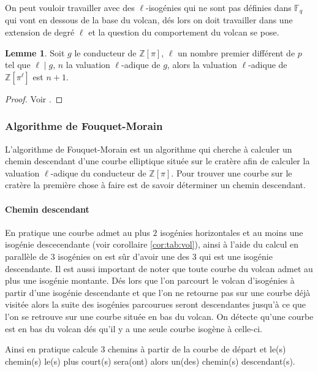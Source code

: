 \documentclass[10pt,a4paper]{book}
\theoremstyle{plain}
\theoremstyle{definition}
\newtheorem{lem}[thm]{Lemme}
\theoremstyle{definition}
\theoremstyle{definition}
\theoremstyle{definition}
\theoremstyle{remark}
\theoremstyle{remark}
\theoremstyle{definition}
\begin{document}
On peut vouloir travailler avec des $\ell$-isogénies qui ne sont pas définies dans $\mathbb{F}_q$ qui vont en dessous de la base du volcan, dés lors on doit travailler dans une extension de degré $\ell$ et la question du comportement du volcan se pose.

\begin{lem}
\label{lem:val:ext}
Soit $g$ le conducteur de $\mathbb{Z}[\pi]$, $\ell$ un nombre premier différent de $p$ tel que $\ell \mid g$, $n$ la valuation $\ell$-adique de $g$, alors la valuation $\ell$-adique de $\mathbb{Z}[\pi^{\ell}]$ est $n+1$. 
\end{lem}

\begin{proof}
Voir \cite[Proposition 6]{MiretMSTV08}.
\end{proof}

\subsubsection{Algorithme de Fouquet-Morain}
\label{sub:alg:FM}
L'algorithme de Fouquet-Morain \cite{FouquetMorain02} est un algorithme qui cherche à calculer un chemin descendant d'une courbe elliptique située sur le cratère afin de calculer la valuation $\ell$-adique du conducteur de $\mathbb{Z}[\pi]$. Pour trouver une courbe sur le cratère la première chose à faire est de savoir déterminer un chemin descendant. 

\paragraph{Chemin descendant}
En pratique une courbe admet au plus $2$ isogénies horizontales et au moins une isogénie descecendante (voir corollaire \ref{cor:tab:vol}), ainsi à l'aide du calcul en parallèle de 3 isogénies on est sûr d'avoir une des 3 qui est une isogénie descendante. Il est aussi important de noter que toute courbe du volcan admet au plus une isogénie montante. Dés lors que l'on parcourt le volcan d'isogénies à partir d'une isogénie descendante et que l'on ne retourne pas sur une courbe déjà visitée alors la suite des isogénies parcourues seront descendantes jusqu'à ce que l'on se retrouve sur une courbe située en bas du volcan. On détecte qu'une courbe est en bas du volcan dés qu'il y a une seule courbe isogène à celle-ci.

Ainsi en pratique \cite{FouquetMorain02} calcule 3 chemins à partir de la courbe de départ et le(s) chemin(s) le(s) plus court(s) sera(ont) alors un(des) chemin(s) descendant(s). 
\end{document}
